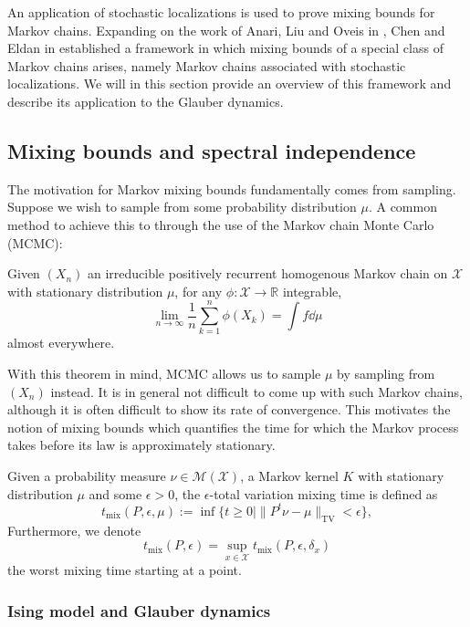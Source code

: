An application of stochastic localizations is used to prove mixing bounds for Markov chains. 
Expanding on the work of Anari, Liu and Oveis in \cite{Anari_2020}, Chen and Eldan in \cite{Chen_2022} 
established a framework in which mixing bounds of a special class of Markov chains arises, namely Markov 
chains associated with stochastic localizations. We will in this section provide an overview of this 
framework and describe its application to the Glauber dynamics.

\subsection{Mixing bounds and spectral independence}

The motivation for Markov mixing bounds fundamentally comes from sampling. Suppose we wish to sample 
from some probability distribution $\mu$. A common method to achieve this to through the use of the 
Markov chain Monte Carlo (MCMC):
\begin{theorem}\label{thm:markov_conv}
  Given \((X_n)\) an irreducible positively recurrent homogenous Markov chain on \(\mathcal{X}\) with
  stationary distribution \(\mu\), for any \(\phi : \mathcal{X} \to \mathbb{R}\) integrable, 
  \[\lim_{n \to \infty} \frac{1}{n} \sum_{k = 1}^n \phi(X_k) = \int f \dd \mu\]
  almost everywhere.  
\end{theorem}
With this theorem in mind, MCMC allows us to sample \(\mu\) by sampling from \((X_n)\) instead. It is in general 
not difficult to come up with such Markov chains, although it is often difficult to show its rate of convergence. 
This motivates the notion of mixing bounds which quantifies the time for which the Markov process takes before 
its law is approximately stationary.

\begin{definition}
  Given a probability measure \(\nu \in \mathcal{M}(\mathcal{X})\), a Markov kernel \(K\) with stationary 
  distribution \(\mu\) and some \(\epsilon > 0\), the \(\epsilon\)-total variation mixing time is defined as 
  \[t_{\text{mix}}(P, \epsilon, \mu) := \inf \{t \ge 0 \mid \|P^t\nu - \mu\|_{\text{TV}} < \epsilon\},\]
  Furthermore, we denote 
  \[t_{\text{mix}}(P, \epsilon) = \sup_{x \in \mathcal{X}} t_{\text{mix}}(P, \epsilon, \delta_x)\]
  the worst mixing time starting at a point.
\end{definition}

\subsubsection{Ising model and Glauber dynamics}

